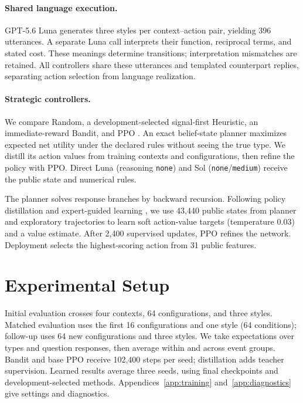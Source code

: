 \paragraph{Shared language execution.}

GPT-5.6 Luna generates three styles per context--action pair, yielding 396 utterances. A separate Luna call interprets their function, reciprocal terms, and stated cost. These meanings determine transitions; interpretation mismatches are retained. All controllers share these utterances and templated counterpart replies, separating action selection from language realization.

\paragraph{Strategic controllers.}

We compare Random, a development-selected signal-first Heuristic, an immediate-reward Bandit, and PPO \citep{schulman2017ppo}. An exact belief-state planner maximizes expected net utility under the declared rules without seeing the true type. We distill its action values from training contexts and configurations, then refine the policy with PPO. Direct Luna (reasoning \texttt{none}) and Sol (\texttt{none}/\texttt{medium}) receive the public state and numerical rules.

The planner solves response branches by backward recursion. Following policy distillation and expert-guided learning \citep{rusu2016distillation,anthony2017expert}, we use 43,440 public states from planner and exploratory trajectories to learn soft action-value targets (temperature 0.03) and a value estimate. After 2,400 supervised updates, PPO refines the network. Deployment selects the highest-scoring action from 31 public features.

\section{Experimental Setup}

Initial evaluation crosses four contexts, 64 configurations, and three styles. Matched evaluation uses the first 16 configurations and one style (64 conditions); follow-up uses 64 new configurations and three styles. We take expectations over types and question responses, then average within and across event groups. Bandit and base PPO receive 102,400 steps per seed; distillation adds teacher supervision. Learned results average three seeds, using final checkpoints and development-selected methods. Appendices~\ref{app:training} and~\ref{app:diagnostics} give settings and diagnostics.

